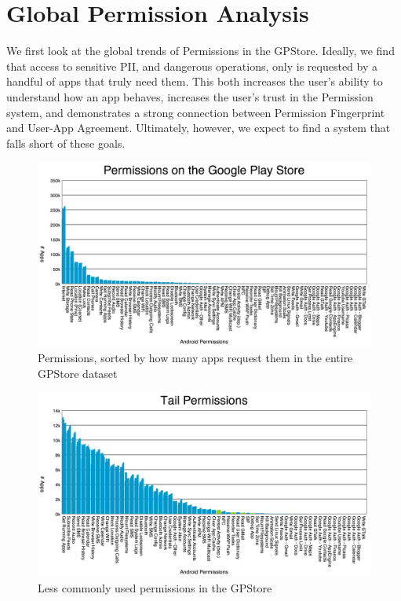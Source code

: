
\section{Global Permission Analysis}
We first look at the global trends of Permissions in the GPStore. Ideally, we find that access to sensitive PII, and dangerous operations, only is requested by a handful of apps that truly need them. This both increases the user's ability to understand how an app behaves, increases the user's trust in the Permission system, and demonstrates a strong connection between Permission Fingerprint and User-App Agreement. Ultimately, however, we expect to find a system that falls short of these goals.

\begin{figure}[h]
\begin{center}
\includegraphics[width=1.0\columnwidth]{figs/AllPermissions}
\caption{Permissions, sorted by how many apps request them in the entire GPStore dataset}
\label{fig:allpermissions}
\end{center}
\end{figure}

\begin{figure}[h]
\begin{center}
\includegraphics[width=1.0\columnwidth]{figs/AllPermissions_Tail}
\caption{Less commonly used permissions in the GPStore}
\label{fig:tailpermissions}
\end{center}
\end{figure}

